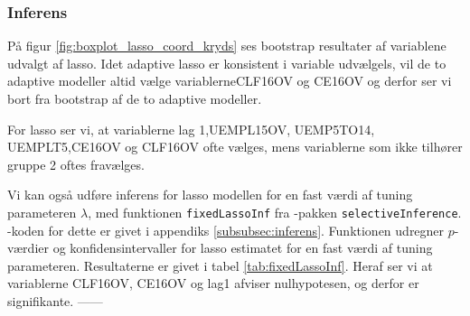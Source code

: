 \subsubsection*{Inferens}
På figur \ref{fig:boxplot_lasso_coord_kryds} ses bootstrap resultater af variablene udvalgt af lasso.
Idet adaptive lasso er konsistent i variable udvælgels, vil de to adaptive modeller altid vælge variablerne\textcolor{blue3}{CLF16OV} og \textcolor{blue3}{CE16OV} og derfor ser vi bort fra bootstrap af de to adaptive modeller. 

For lasso ser vi, at variablerne \textcolor{blue3}{lag 1},\textcolor{blue3}{UEMPL15OV}, \textcolor{blue3}{UEMP5TO14}, \textcolor{blue3}{UEMPLT5},\textcolor{blue3}{CE16OV} og \textcolor{blue3}{CLF16OV} ofte vælges, mens variablerne som ikke tilhører gruppe 2 oftes fravælges.

%
%

Vi kan også udføre inferens for lasso modellen for en fast værdi af tuning parameteren \(\lambda\), med funktionen \texttt{fixedLassoInf} fra \Rlang-pakken \texttt{selectiveInference}.
\Rlang-koden for dette er givet i appendiks \ref{subsubsec:inferens}.
Funktionen udregner \(p\)-værdier og konfidensintervaller for lasso estimatet for en fast værdi af tuning parameteren.
Resultaterne er givet i tabel \ref{tab:fixedLassoInf}.
Heraf ser vi at variablerne \textcolor{blue3}{CLF16OV}, \textcolor{blue3}{CE16OV} og \textcolor{blue3}{lag1} afviser nulhypotesen, og derfor er signifikante. ------
%

%

\newpage
%
%

 


\newpage